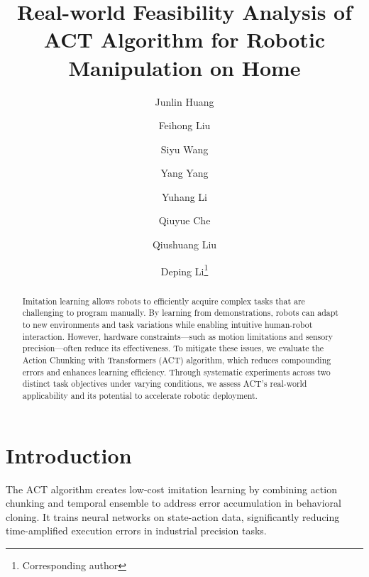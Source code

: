 \documentclass[runningheads]{llncs}
\begin{document}
\title{Real-world Feasibility Analysis of ACT Algorithm for Robotic Manipulation on Home}

\author{
  Junlin Huang \and
  Feihong Liu \and
  Siyu Wang \and
  Yang Yang \and
  Yuhang Li \and
  Qiuyue Che \and
  Qiushuang Liu \and
  Deping Li\thanks{Corresponding author}  %
}


\maketitle




%
\begin{abstract}
Imitation learning allows robots to efficiently acquire complex tasks that are challenging to program manually. By learning from demonstrations, robots can adapt to new environments and task variations while enabling intuitive human-robot interaction. However, hardware constraints—such as motion limitations and sensory precision—often reduce its effectiveness. To mitigate these issues, we evaluate the Action Chunking with Transformers (ACT) algorithm, which reduces compounding errors and enhances learning efficiency. Through systematic experiments across two distinct task objectives under varying conditions, we assess ACT’s real-world applicability and its potential to accelerate robotic deployment.


\end{abstract}
%
%
%
\section{Introduction}
The ACT algorithm creates low-cost imitation learning by combining action chunking and temporal ensemble to address error accumulation in behavioral cloning. It trains neural networks on state-action data, significantly reducing time-amplified execution errors in industrial precision tasks. 
 
\end{document}
